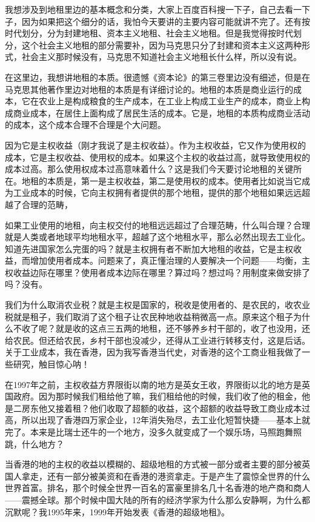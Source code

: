 \documentclass[UTF8, 12pt, a4paper]{ctexrep}
\begin{document}
我想涉及到地租里边的基本概念和分类，大家上百度百科搜一下子，自己去看一下子，因为如果把这个细分的话，我怕今天要讲的主要内容可能就讲不完了。还有按时代划分，分为封建地租、资本主义地租、社会主义地租。但是我觉得按时代划分，这个社会主义地租的部分需要补，因为马克思只分了封建和资本主义这两种形式，社会主义那时候没有，马克思不知道社会主义地租长什么样，所以没有说。

在这里边，我想讲地租的本质。很遗憾《资本论》的第三卷里边没有细述，但是在马克思其他著作里边对地租的本质是有详细讨论的。地租的本质是商业运行的成本，它在农业上是构成粮食的生产成本，在工业上构成工业生产的成本，商业上构成商业成本，在居住上面构成了居民生活的成本。它是，地租的本质构成商业活动的成本，这个成本合理不合理是个大问题。

因为它是主权收益（刚才我说了是主权收益）。作为主权收益，它又作为使用权的成本，它是主权收益、使用权的成本。如果这个主权的收益过高，就导致使用权的成本过高。那么使用权成本过高意味着什么？这是我们今天要讨论地租的关键所在。地租的本质是，第一是主权收益，第二是使用权的成本。使用者比如说当它成为工业成本的时候，它向主权拥有者提供的那个地租，提供的那个地租如果远远超越了合理的范畴，

如果工业使用的地租，向主权交付的地租远远超过了合理范畴，什么叫合理？合理就是人类或者地球平均地租水平，超越了这个地租水平，那么必然出现去工业化。知道先进国家怎么完蛋的吗？就是主权拥有者不断加大地租的收益，它是主权收益，而增加使用者成本。问题来了，真正懂治理的人要解决一个问题——均衡，主权收益边际在哪里？使用者成本边际在哪里？算过吗？想过吗？用制度来做安排了吗？没有。

我们为什么取消农业税？就是主权是国家的，税收是使用者的、是农民的，收农业税就是租子，我们取消了这个租子让农民种地收益稍微高一点。原来这个租子为什么不收了呢？就是收的这点三五两的地租，还不够养乡村干部的，收了也没用，还给农民。但还给农民，乡村干部也没减少，还得从工业进行转移支付，这是后话。关于工业成本，我在香港，因为我写香港当代史，对香港的这个工商业租我做了一些研究，触目惊心呐！

在1997年之前，主权收益方界限街以南的地方是英女王收，界限街以北的地方是英国政府。因为那时候我们租给他了嘛，我们租给他的时候，我们收了他的租金，他是二房东他又接着租？他们收取了超额的收益，这个超额的收益导致工商业成本过高，所以出现了香港四万家企业，12年消失殆尽，去工业化短暂快捷——基本上就完了。本来是比瑞士还牛的一个地方，没多久就变成了一个娱乐场，马照跑舞照跳，什么地方？

当香港的地的主权的收益以模糊的、超级地租的方式被一部分或者主要的部分被英国人拿走，还有一部分被美资和在香港的港资拿走。于是产生了震惊全世界的什么世界首富。排名，那个时候全世界一百名的富豪里排名几十名香港的地产商和商人——震撼全球。那个时候中国大陆的所有的经济学家为什么那么安静啊，为什么都沉默呢？我1995年来，1999年开始发表《香港的超级地租》。
\end{document}
